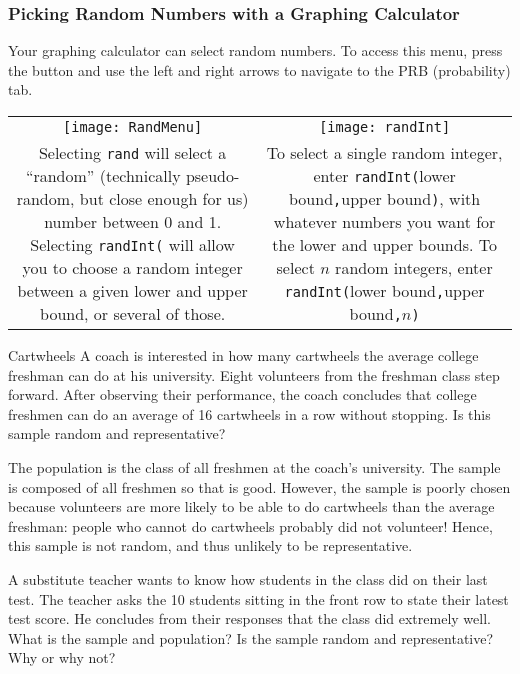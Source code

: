 \subsubsection*{Picking Random Numbers with a Graphing Calculator}
Your graphing calculator can select random numbers.  To access this menu, press the  button and use the left and right arrows to navigate to the PRB (probability) tab.
\begin{center}
\begin{tabular}{c | c}
\texttt{[image: RandMenu]}
& \texttt{[image: randInt]}\\
\parbox{0.45\textwidth}{Selecting \texttt{rand} will select a ``random'' (technically pseudo-random, but close enough for us) number between 0 and 1.  Selecting \texttt{randInt(} will allow you to choose a random integer between a given lower and upper bound, or several of those.}
& \parbox{0.45\textwidth}{To select a single random integer, enter \texttt{randInt(}lower bound\texttt{,}upper bound\texttt{)}, with whatever numbers you want for the lower and upper bounds.  To select $n$ random integers, enter \texttt{randInt(}lower bound\texttt{,}upper bound\texttt{,}$n$\texttt{)}}
\end{tabular}
\end{center}

\begin{example}[https://www.youtube.com/watch?v=mm1iQfMgNHE&list=PLfmpjsIzhzttL_Uec2nCbDRcAcUF7NKG8&index=3]{Cartwheels}
A coach is interested in how many cartwheels the average college freshman can do at his university. Eight volunteers from the freshman class step forward. After observing their
performance, the coach concludes that college freshmen can do an average of 16 cartwheels in a row without stopping. Is this sample random and representative?

\sol
The population is the class of all freshmen at the coach's university. The sample is composed of all freshmen so that is good. However, the sample is poorly chosen because volunteers are more likely to be able to do cartwheels than the average freshman: people who cannot do cartwheels probably did not volunteer! Hence, this sample is not random, and thus unlikely to be representative.
\end{example}

\begin{try}
A substitute teacher wants to know how students in the class did on their last test. The teacher asks the 10 students sitting in the front row to state their latest test score. He concludes from their responses that the class did extremely well. What is the sample and population? Is the sample random and representative? Why or why not?
\end{try}


